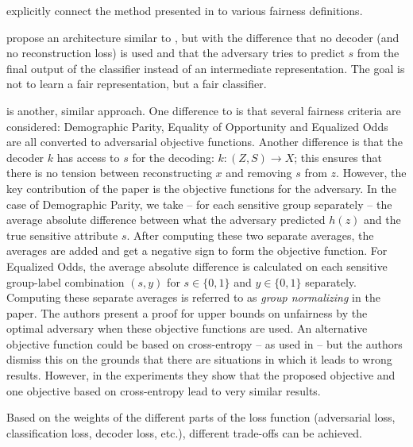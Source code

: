 \citet{beutel2017data} explicitly connect the method presented in \citet{edwards2016censoring}
to various fairness definitions.

\citet{zhang2018mitigating} propose an architecture similar to \citet{edwards2016censoring},
but with the difference that no decoder (and no reconstruction loss) is used
and that the adversary tries to predict \(s\) from the final output of the classifier
instead of an intermediate representation.
The goal is not to learn a fair representation, but a fair classifier.

\citet{madras2018learning} is another, similar approach.
One difference to \citet{edwards2016censoring} is that several fairness criteria are considered:
Demographic Parity, Equality of Opportunity and Equalized Odds are all converted to adversarial objective functions.
Another difference is that the decoder \(k\) has access to \(s\) for the decoding: \(k: (Z, S)\to X\);
this ensures that there is no tension between reconstructing \(x\) and removing \(s\) from \(z\).
However, the key contribution of the paper is the objective functions for the adversary.
In the case of Demographic Parity, we take -- for each sensitive group separately --
the average absolute difference between what the adversary predicted \(h(z)\) and the true sensitive attribute \(s\).
After computing these two separate averages,
the averages are added and get a negative sign to form the objective function.
For Equalized Odds,
the average absolute difference is calculated on each sensitive group-label combination
\((s, y)\) for \(s \in \{0, 1\}\) and \(y \in \{0, 1\}\) separately.
Computing these separate averages is referred to as \emph{group normalizing} in the paper.
The authors present a proof for upper bounds on unfairness by the optimal adversary
when these objective functions are used.
An alternative objective function could be based on cross-entropy -- as used in \citet{edwards2016censoring} --
but the authors dismiss this on the grounds that there are situations in which it leads to wrong results.
However, in the experiments they show
that the proposed objective and one objective based on cross-entropy lead to very similar results.

Based on the weights of the different parts of the loss function
(adversarial loss, classification loss, decoder loss, etc.),
different trade-offs can be achieved.

